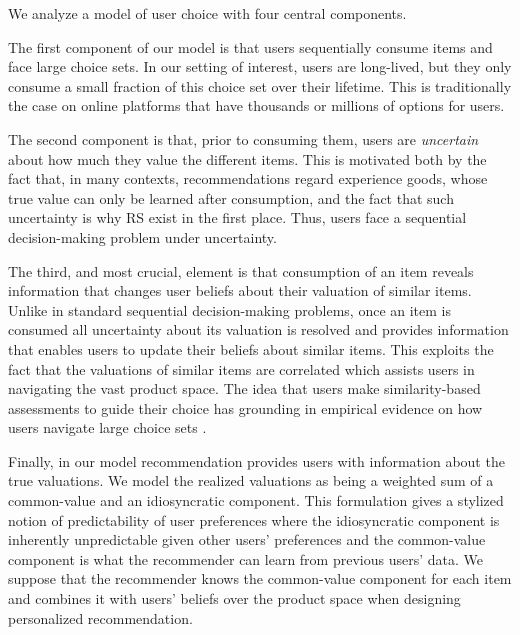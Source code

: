\documentclass[manuscript]{acmart}
\newcommand{\xhdr}[1]{\vspace{1mm} \noindent{\bf #1}}
\begin{document}
\xhdr{Our Model.} We analyze a model of user choice with four central components.
\par
The first component of our model is that users sequentially consume items and face large choice sets. In our setting of interest, users are long-lived, but they only consume a small fraction of this choice set over their lifetime. This is traditionally the case on online platforms that have thousands or millions of options for users.
\par
The second component is that, prior to consuming them, users are \textit{uncertain} about how much they value the different items.
This is motivated both by the fact that, in many contexts, recommendations regard experience goods, whose true value can only be learned after consumption, and the fact that such uncertainty is why RS exist in the first place. Thus, users face a sequential decision-making problem under uncertainty.
\par 
The third, and most crucial, element is that consumption of an item reveals information that changes user beliefs about their valuation of similar items. Unlike in standard sequential decision-making problems, once an item is consumed all uncertainty about its valuation is resolved and provides information that enables users to update their beliefs about similar items. This exploits the fact that the valuations of similar items are correlated which assists users in navigating the vast product space. The idea that users make similarity-based assessments to guide their choice has grounding in empirical evidence on how users navigate large choice sets \cite{schulz2019structured}.
\par 
Finally, in our model recommendation provides users with information about the true valuations. We model the realized valuations as being a weighted sum of a common-value and an idiosyncratic component. This formulation gives a stylized notion of predictability of user preferences where the idiosyncratic component is inherently unpredictable given other users' preferences and the common-value component is what the recommender can learn from previous users' data. We suppose that the recommender knows the common-value component for each item and combines it with users' beliefs over the product space when designing personalized recommendation.
\end{document}
